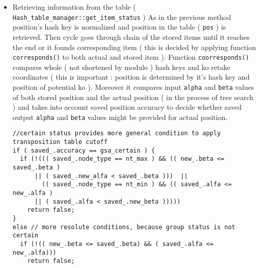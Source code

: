 \begin{itemize}
\item Retrieving information from the table ( {\tt Hash\_\-table\_\-manager::get\_\-item\_\-status} ) As in the previous method position's hash key is normalized and position in the table ( {\tt pos} ) is retrieved. Then cycle goes through chain of the stored items until it reaches the end or it founds corresponding item ( this is decided by applying function {\tt corresponds()} to both actual and stored item ). Function {\tt coorresponds()} compares whole ( not shortened by modulo ) hash keys and ko retake coordinates ( this is important : position is determined by it's hash key and position of potential ko ). Moreover it compares input {\tt alpha} and {\tt beta} values of both stored position and the actual position ( in the process of tree search ) and takes into account saved position accuracy to decide whether saved output {\tt alpha} and {\tt beta} values might be provided for actual position. 

\footnotesize\begin{verbatim}//certain status provides more general condition to apply transposition table cutoff
if ( saved_.accuracy == gsa_certain ) { 
  if (!((( saved_.node_type == nt_max ) && (( new_.beta <= saved_.beta ) 
      || ( saved_.new_alfa < saved_.beta )))  || 
        (( saved_.node_type == nt_min ) && (( saved_.alfa <= new_.alfa ) 
      || ( saved_.alfa < saved_.new_beta ))))) 
    return false;
} 
else // more resolute conditions, because group status is not certain 
  if (!(( new_.beta <= saved_.beta) && ( saved_.alfa <= new_.alfa))) 
    return false;
\end{verbatim}
\normalsize
 \end{itemize}
